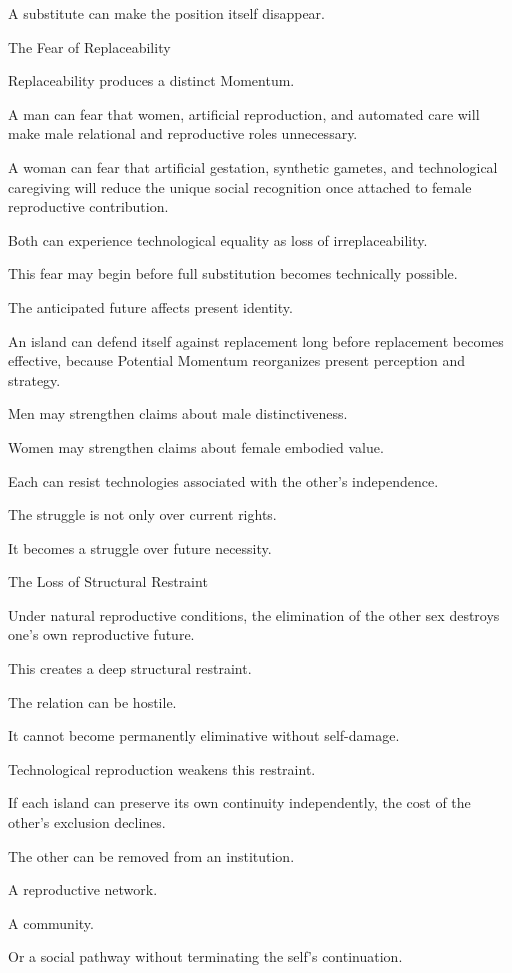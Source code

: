 A substitute can make the position itself disappear.

The Fear of Replaceability

Replaceability produces a distinct Momentum.

A man can fear that women, artificial reproduction, and automated care will make male relational and reproductive roles unnecessary.

A woman can fear that artificial gestation, synthetic gametes, and technological caregiving will reduce the unique social recognition once attached to female reproductive contribution.

Both can experience technological equality as loss of irreplaceability.

This fear may begin before full substitution becomes technically possible.

The anticipated future affects present identity.

An island can defend itself against replacement long before replacement becomes effective, because Potential Momentum reorganizes present perception and strategy.

Men may strengthen claims about male distinctiveness.

Women may strengthen claims about female embodied value.

Each can resist technologies associated with the other’s independence.

The struggle is not only over current rights.

It becomes a struggle over future necessity.

The Loss of Structural Restraint

Under natural reproductive conditions, the elimination of the other sex destroys one’s own reproductive future.

This creates a deep structural restraint.

The relation can be hostile.

It cannot become permanently eliminative without self-damage.

Technological reproduction weakens this restraint.

If each island can preserve its own continuity independently, the cost of the other’s exclusion declines.

The other can be removed from an institution.

A reproductive network.

A community.

Or a social pathway without terminating the self’s continuation.

